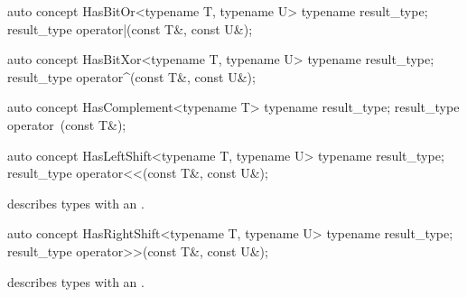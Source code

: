 \documentclass[american,twoside]{book}
\begin{document}
\begin{itemdescr}
\pnum
{}
\end{itemdescr}

\begin{itemdecl}
auto concept HasBitOr<typename T, typename U> {
  typename result_type;
  result_type operator|(const T&, const U&);
}
\end{itemdecl}

\begin{itemdescr}
\pnum
{}
\end{itemdescr}

\begin{itemdecl}
auto concept HasBitXor<typename T, typename U> {
  typename result_type;
  result_type operator^(const T&, const U&);
}
\end{itemdecl}

\begin{itemdescr}
\pnum
{}
\end{itemdescr}

\begin{itemdecl}
auto concept HasComplement<typename T> {
  typename result_type;
  result_type operator~(const T&);
}
\end{itemdecl}

\begin{itemdescr}
\pnum
{}
\end{itemdescr}

\begin{itemdecl}
auto concept HasLeftShift<typename T, typename U> {
  typename result_type;
  result_type operator<<(const T&, const U&);
}
\end{itemdecl}

\begin{itemdescr}
\pnum
\mbox{\reallynote} describes types with an \mbox{}.
\end{itemdescr}

\begin{itemdecl}
auto concept HasRightShift<typename T, typename U> {
  typename result_type;
  result_type operator>>(const T&, const U&);
}
\end{itemdecl}

\begin{itemdescr}
\pnum
\mbox{\reallynote} describes types with an \mbox{}.
\end{itemdescr}
\end{document}
